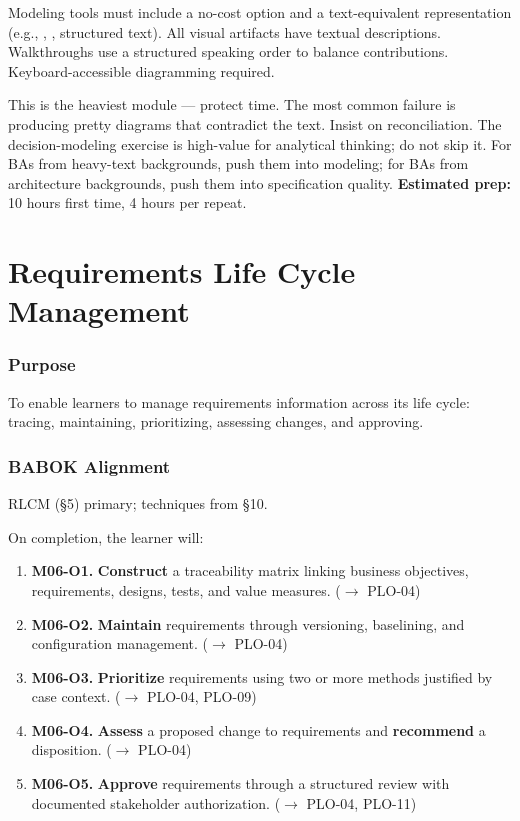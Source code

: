 \documentclass[11pt,letterpaper,oneside]{report}
\begin{document}
\begin{curriculumnote}
Modeling tools must include a no-cost option and a text-equivalent representation (e.g., , , structured text). All visual artifacts have textual descriptions. Walkthroughs use a structured speaking order to balance contributions. Keyboard-accessible diagramming required.
\end{curriculumnote}

\begin{curriculumteachingnotes}
This is the heaviest module --- protect time. The most common failure is producing pretty diagrams that contradict the text. Insist on reconciliation. The decision-modeling exercise is high-value for analytical thinking; do not skip it. For BAs from heavy-text backgrounds, push them into modeling; for BAs from architecture backgrounds, push them into specification quality. \textbf{Estimated prep:} 10 hours first time, 4 hours per repeat.
\end{curriculumteachingnotes}

\chapter{Requirements Life Cycle Management}

\subsection*{Purpose}
To enable learners to manage requirements information across its life cycle: tracing, maintaining, prioritizing, assessing changes, and approving.

\subsection*{BABOK Alignment}
RLCM (\S5) primary; techniques from \S10.

\begin{outcomes}
On completion, the learner will:
\begin{enumerate}
  \item \textbf{M06-O1.} \textbf{Construct} a traceability matrix linking business objectives, requirements, designs, tests, and value measures. ($\to$ PLO-04)
  \item \textbf{M06-O2.} \textbf{Maintain} requirements through versioning, baselining, and configuration management. ($\to$ PLO-04)
  \item \textbf{M06-O3.} \textbf{Prioritize} requirements using two or more methods justified by case context. ($\to$ PLO-04, PLO-09)
  \item \textbf{M06-O4.} \textbf{Assess} a proposed change to requirements and \textbf{recommend} a disposition. ($\to$ PLO-04)
  \item \textbf{M06-O5.} \textbf{Approve} requirements through a structured review with documented stakeholder authorization. ($\to$ PLO-04, PLO-11)
\end{enumerate}
\end{outcomes}
\end{document}

